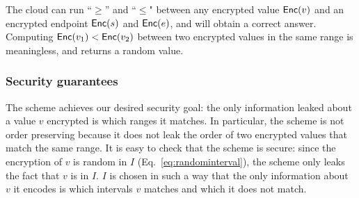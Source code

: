 The cloud can run ``$\ge$'' and ``$\le$" between any encrypted value $\mathsf{Enc}(v)$ and an encrypted endpoint $\mathsf{Enc}(s)$ and $\mathsf{Enc}(e)$, and will obtain a correct answer. Computing $\mathsf{Enc}(v_1) < \mathsf{Enc}(v_2)$  between two encrypted values in the same range is meaningless, and returns a random value.


\subsubsection{Security guarantees}

The scheme achieves our desired security goal: the only information leaked about a value $v$ encrypted is which ranges it matches. 
In particular, the scheme is not order preserving because it does not leak the order of two encrypted values that match the same range. It is easy to check that the scheme is secure: since the encryption of $v$ is random in $I$ (Eq.~\ref{eq:randominterval}), the scheme only leaks the fact that $v$ is in $I$. $I$ is chosen in such a way that the only information about $v$ it encodes is which intervals $v$ matches and which it does not match.








